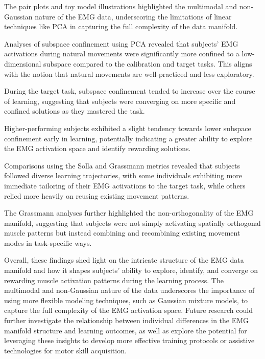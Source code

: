 \documentclass[../main.tex]{subfiles}
\begin{document}
The pair plots and toy model illustrations highlighted the multimodal and non-Gaussian nature of the EMG data, underscoring the limitations of linear techniques like PCA in capturing the full complexity of the data manifold.

Analyses of subspace confinement using PCA revealed that subjects' EMG activations during natural movements were significantly more confined to a low-dimensional subspace compared to the calibration and target tasks. This aligns with the notion that natural movements are well-practiced and less exploratory.

During the target task, subspace confinement tended to increase over the course of learning, suggesting that subjects were converging on more specific and confined solutions as they mastered the task.

Higher-performing subjects exhibited a slight tendency towards lower subspace confinement early in learning, potentially indicating a greater ability to explore the EMG activation space and identify rewarding solutions.

Comparisons using the Solla and Grassmann metrics revealed that subjects followed diverse learning trajectories, with some individuals exhibiting more immediate tailoring of their EMG activations to the target task, while others relied more heavily on reusing existing movement patterns.

The Grassmann analyses further highlighted the non-orthogonality of the EMG manifold, suggesting that subjects were not simply activating spatially orthogonal muscle patterns but instead combining and recombining existing movement modes in task-specific ways.

Overall, these findings shed light on the intricate structure of the EMG data manifold and how it shapes subjects' ability to explore, identify, and converge on rewarding muscle activation patterns during the learning process. The multimodal and non-Gaussian nature of the data underscores the importance of using more flexible modeling techniques, such as Gaussian mixture models, to capture the full complexity of the EMG activation space.
Future research could further investigate the relationship between individual differences in the EMG manifold structure and learning outcomes, as well as explore the potential for leveraging these insights to develop more effective training protocols or assistive technologies for motor skill acquisition.

\cleardoublepage\printendnotes%
\ifSubfilesClassLoaded{%
    \newpage%
}{}%
\end{document}
